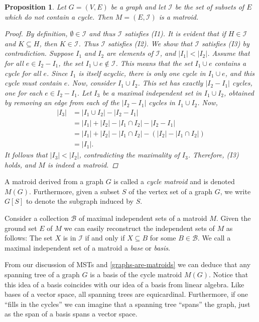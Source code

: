 \documentclass[a4paper,11pt]{report}
\theoremstyle{plain}
\newtheorem{prp}[prp]{Proposition}
\theoremstyle{definition}
\newcommand{\I}{\mathcal{I}}
\newcommand{\B}{\mathscr{B}}
\begin{document}
\begin{prp}\label{graphs-are-matroids}
Let $G = (V,E)$ be a graph and let $\I$ be the set of subsets of $E$ which
do not contain a cycle. Then $M = (E,\I)$ is a matroid.

\begin{proof}
By definition, $\emptyset \in \I$ and thus $\I$ satisfies (I1). It is evident
that if $H \in \I$ and $K \subseteq H$, then $K \in \I$. Thus $\I$ satisfies
(I2). We show that $\I$ satisfies (I3) by contradiction. Suppose $I_1$ and
$I_2$ are elements of $\I$, and $|I_1| < |I_2|$. Assume that for all $e \in
I_2 - I_1$, the set $I_1 \cup e \not\in \I$. This means that the set $I_1
\cup e$ contains a cycle for all $e$. Since $I_1$ is itself acyclic, there
is only one cycle in $I_1 \cup e$, and this cycle must contain $e$. Now,
consider $I_1 \cup I_2$. This set has exactly $|I_2 - I_1|$ cycles, one for
each $e \in I_2 - I_1$. Let $I_3$ be a maximal independent set in
$I_1 \cup I_2$, obtained by removing an edge from each of the $|I_2 - I_1|$
cycles in $I_1 \cup I_2$. Now,
\begin{align*}
    |I_3| &= |I_1 \cup I_2| - |I_2 - I_1|\\
    &= |I_1| + |I_2| - |I_1 \cap I_2| - |I_2 - I_1|\\
    &= |I_1| + |I_2| - |I_1 \cap I_2| - (|I_2| - |I_1 \cap I_2|)\\
    &= |I_1|.
\end{align*}
It follows that $|I_3| < |I_2|$, contradicting the maximality of $I_3$.
Therefore, (I3) holds, and $M$ is indeed a matroid.
\end{proof}
\end{prp}

A matroid derived from a graph $G$ is called a \emph{cycle matroid} and is
denoted $M(G)$. Furthermore, given a subset $S$ of the vertex set of a graph
$G$, we write $G[S]$ to denote the subgraph induced by $S$.



Consider a collection $\B$ of maximal independent sets of a matroid $M$.
Given the ground set $E$ of $M$ we can easily reconstruct the independent
sets of $M$ as follows: The set $X$ is in $\I$ if and only if $X \subseteq
B$ for some $B \in \B$. We call a maximal independent set of a matroid a
\emph{base} or \emph{basis}.

From our discussion of MSTs and \autoref{graphs-are-matroids} we can deduce
that any spanning tree of a graph $G$ is a basis of the cycle matroid $M(G)$.
Notice that this idea of a basis coincides with our idea of a basis from linear
algebra. Like bases of a vector space, all spanning trees are equicardinal.
Furthermore, if one ``fills in the cycles'' we can imagine that a spanning tree
``spans'' the graph, just as the span of a basis spans a vector space.
\end{document}
